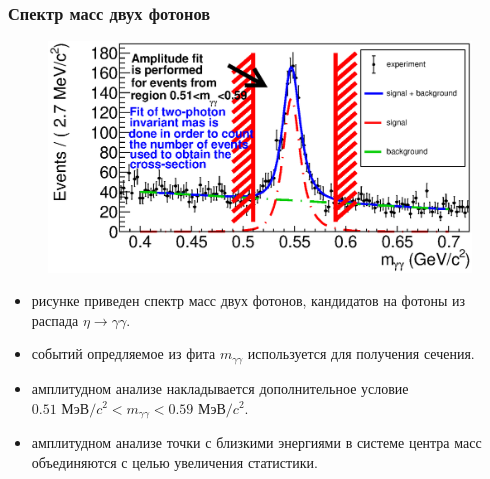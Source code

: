 \documentclass{beamer}
\begin{document}
  \begin{frame}
    \frametitle{Спектр масс двух фотонов}
    \begin{figure}
      \includegraphics[width=0.8\linewidth]{figures/mgg_e700.eps}
    \end{figure}
    \begin{itemize}
    \item{ рисунке приведен спектр масс двух фотонов, кандидатов на фотоны из
        распада $\eta\to\gamma\gamma$.}
    \item{ событий опредляемое из фита $m_{\gamma\gamma}$ используется для получения
        сечения.}
    \item{ амплитудном анализе накладывается дополнительное условие
        $0.51\text{ МэВ}/c^2<m_{\gamma\gamma}<0.59\text{ МэВ}/c^2$.}
    \item{ амплитудном анализе точки с близкими энергиями в системе центра
        масс объединяются с целью увеличения статистики.}
    \end{itemize}
  \end{frame}
\end{document}
